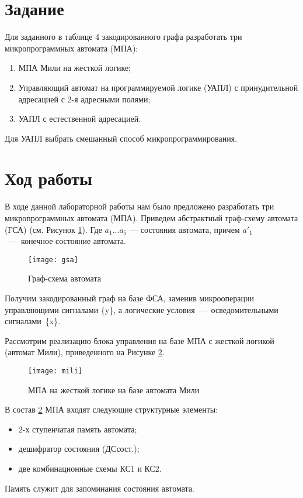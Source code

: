 \documentclass[a4paper,14pt]{extarticle}
\begin{document}
	
	
	
	
	
	\newpage
	\section*{Задание}
	Для заданного в таблице 4 закодированного графа разработать три микропрограммных автомата (МПА):
	\begin{enumerate}
		\item МПА Мили на жесткой логике;
		\item Управляющий автомат на программируемой
		логике (УАПЛ) с принудительной адресацией с 2-я адресными полями;
		\item УАПЛ с естественной адресацией. 
	\end{enumerate}
	Для УАПЛ выбрать смешанный способ микропрограммирования.
	
\section* {Ход работы}
	В ходе данной лабораторной работы нам было предложено разработать три микропрограммных автомата (МПА). Приведем абстрактный граф-схему автомата (ГСА) (см. Рисунок \ref{fig:gsa}). Где  $a_1 ... a_5$ --- состояния автомата, причем $a'_1$~---~конечное состояние автомата.
	\begin{figure}[h!]
		\centering
		\texttt{[image: gsa]}
		\caption{Граф-схема автомата}
		\label{fig:gsa}
	\end{figure}
	
	Получим закодированный граф на базе ФСА, заменив микрооперации
	управляющими сигналами \{y\}, а логические условия~---~осведомительными сигналами~\{x\}.
	
	Рассмотрим реализацию блока управления на базе МПА с жесткой логикой (автомат Мили), приведенного на Рисунке \ref{fig:mili}.
	
	\begin{figure}[h!]
		\centering
		\texttt{[image: mili]}
		\caption{МПА на жесткой логике на базе автомата Мили }
		\label{fig:mili}
	\end{figure}
В состав \ref{fig:mili} МПА входят следующие структурные элементы: 
\begin{itemize}
	\item 2-х ступенчатая память автомата;
	\item дешифратор состояния (ДСсост.);
	\item две комбинационные схемы КС1 и КС2. 
\end{itemize}
Память служит для запоминания состояния автомата.
\end{document}
